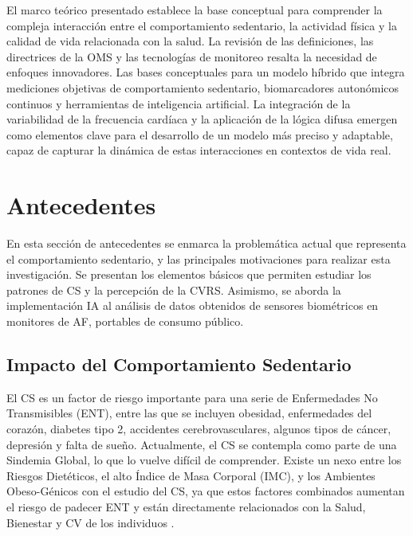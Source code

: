 El marco teórico presentado establece la base conceptual para comprender la compleja interacción entre el comportamiento sedentario, la actividad física y la calidad de vida relacionada con la salud. La revisión de las definiciones, las directrices de la OMS y las tecnologías de monitoreo resalta la necesidad de enfoques innovadores. Las bases conceptuales para un modelo híbrido que integra mediciones objetivas de comportamiento sedentario, biomarcadores autonómicos continuos y herramientas de inteligencia artificial. La integración de la variabilidad de la frecuencia cardíaca y la aplicación de la lógica difusa emergen como elementos clave para el desarrollo de un modelo más preciso y adaptable, capaz de capturar la dinámica de estas interacciones en contextos de vida real.

\section{Antecedentes}
\label{sec:antecedentes}

En esta sección de antecedentes se enmarca la problemática actual que representa el comportamiento sedentario, y las principales motivaciones para realizar esta investigación. Se presentan los elementos básicos que permiten estudiar los patrones de CS y la percepción de la CVRS. Asimismo, se aborda la implementación IA al análisis de datos obtenidos de sensores biométricos en monitores de AF, portables de consumo público.

\subsection{Impacto del Comportamiento Sedentario}
\label{subsec:impacto_cs}

El CS es un factor de riesgo importante para una serie de Enfermedades No Transmisibles (ENT), entre las que se incluyen obesidad, enfermedades del corazón, diabetes tipo 2, accidentes cerebrovasculares, algunos tipos de cáncer, depresión y falta de sueño. Actualmente, el CS se contempla como parte de una Sindemia Global, lo que lo vuelve difícil de comprender. Existe un nexo entre los Riesgos Dietéticos, el alto Índice de Masa Corporal (IMC), y los Ambientes Obeso-Génicos con el estudio del CS, ya que estos factores combinados aumentan el riesgo de padecer ENT y están directamente relacionados con la Salud, Bienestar y CV de los individuos \citep{Swinburn2019Syndemic}.


